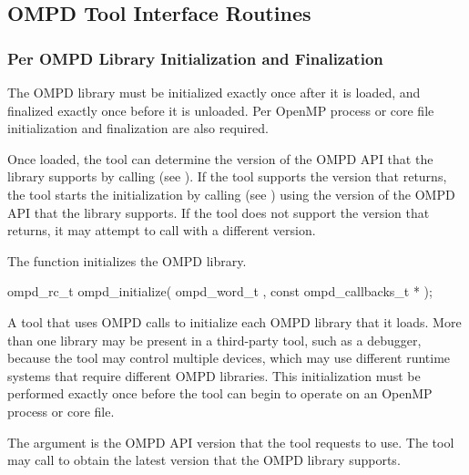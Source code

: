 
\subsection{OMPD Tool Interface Routines}
\label{subsec:ompd-api}

\subsubsection{Per OMPD Library Initialization and Finalization}

The OMPD library must be initialized exactly once after it is loaded, 
and finalized exactly once before it is unloaded. Per OpenMP process 
or core file initialization and finalization are also required.

Once loaded, the tool can determine the version of the OMPD API that 
the library supports by calling  (see
). If the tool supports the 
version that  returns, the tool starts the 
initialization by calling  (see
) using the version of the OMPD API 
that the library supports. If the tool does not support the version that
 returns, it may attempt to call 
 with a different version.



\label{subsubsubsec:ompd_initialize}

\summary
The  function initializes the OMPD library.

\format
\begin{cspecific}
\begin{ompSyntax}
ompd_rc_t ompd_initialize(
  ompd_word_t ,
  const ompd_callbacks_t *
);
\end{ompSyntax}
\end{cspecific}

\descr
A tool that uses OMPD calls  to initialize each OMPD 
library that it loads. More than one library may be present in a third-party 
tool, such as a debugger, because the tool may control multiple devices, which
may use different runtime systems that require different OMPD libraries. This 
initialization must be performed exactly once before the tool can begin to 
operate on an OpenMP process or core file.

\argdesc
The  argument is the OMPD API version that the tool requests
to use. The tool may call  to obtain the latest 
version that the OMPD library supports.


